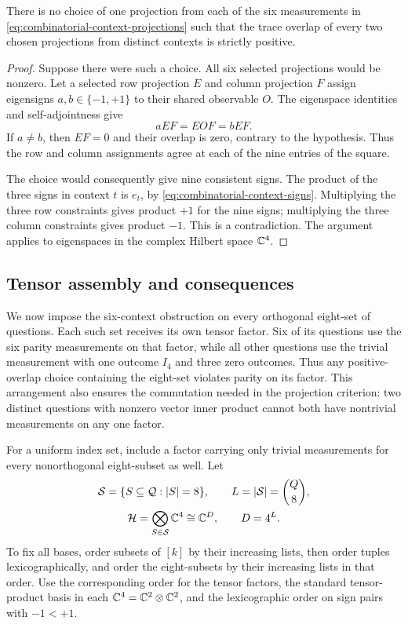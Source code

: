 \begin{lemma}\label{lem:parity-obstruction}
There is no choice of one projection from each of the six measurements
in \eqref{eq:combinatorial-context-projections} such that the trace
overlap of every two chosen projections from distinct contexts is
strictly positive.
\end{lemma}

\begin{proof}
Suppose there were such a choice.  All six selected projections would
be nonzero.  Let a selected row projection \(E\) and column projection
\(F\) assign eigensigns \(a,b\in\{-1,+1\}\) to their shared
observable \(O\).  The eigenspace identities and self-adjointness give
\[
 aEF=EOF=bEF.
\]
If \(a\ne b\), then \(EF=0\) and their overlap is zero, contrary to
the hypothesis.  Thus the row and column assignments agree at each
of the nine entries of the square.

The choice would consequently give nine consistent signs.  The
product of the three signs in context \(t\) is \(e_t\), by
\eqref{eq:combinatorial-context-signs}.  Multiplying the three row
constraints gives product \(+1\) for the nine signs; multiplying
the three column constraints gives product \(-1\).  This is a
contradiction.  The argument applies to eigenspaces in the complex
Hilbert space \(\mathbb C^4\).
\end{proof}

\subsection{Tensor assembly and consequences}

We now impose the six-context obstruction on every orthogonal eight-set
of questions.  Each such set receives its own tensor factor.  Six of its
questions use the six parity measurements on that factor, while
all other questions use the trivial measurement with one outcome $I_4$
and three zero outcomes.  Thus any positive-overlap choice containing
the eight-set violates parity on its factor.  This arrangement also
ensures the commutation needed in the projection criterion: two distinct
questions with nonzero vector inner product cannot both have nontrivial
measurements on any one factor.

For a uniform index set, include a factor carrying only trivial
measurements for every nonorthogonal eight-subset as well.  Let
\begin{equation}\label{eq:combinatorial-tensor-space}
 \begin{gathered}
 \mathcal S=\{S\subseteq\mathcal Q:|S|=8\},\qquad
 L=|\mathcal S|=\binom Q8,\\
 \mathcal H=\bigotimes_{S\in\mathcal S}\mathbb C^4\cong\mathbb C^D,\qquad
 D=4^L.
 \end{gathered}
\end{equation}
To fix all bases, order subsets of \([k]\) by their increasing lists, then order
tuples lexicographically, and order the eight-subsets by their
increasing lists in that order.  Use the corresponding order for the
tensor factors, the standard tensor-product basis in each
\(\mathbb C^4=\mathbb C^2\otimes\mathbb C^2\), and the
lexicographic order on sign pairs with \(-1<+1\).

